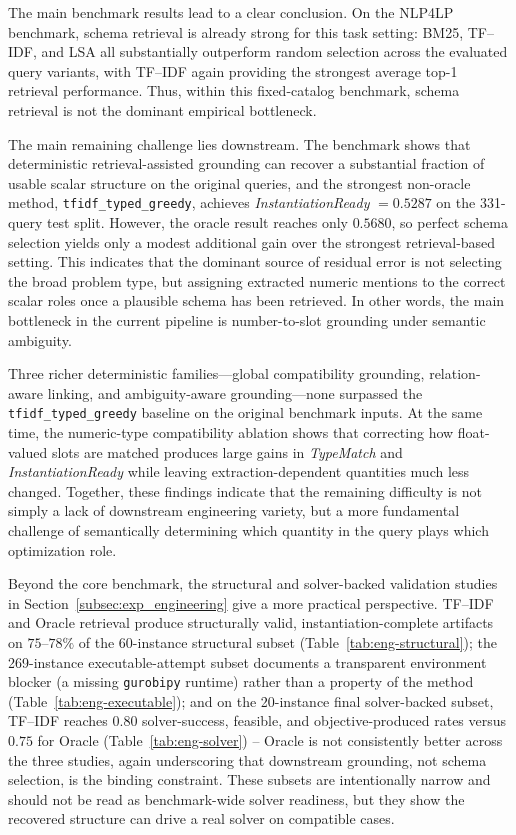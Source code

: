 \documentclass[pdflatex,sn-basic,Numbered]{sn-jnl}
\begin{document}
The main benchmark results lead to a clear conclusion. On the \textsc{NLP4LP} benchmark, schema retrieval is already strong for this task setting: BM25, TF--IDF, and LSA all substantially outperform random selection across the evaluated query variants, with TF--IDF again providing the strongest average top-1 retrieval performance. Thus, within this fixed-catalog benchmark, schema retrieval is not the dominant empirical bottleneck.

The main remaining challenge lies downstream. The benchmark shows that deterministic retrieval-assisted grounding can recover a substantial fraction of usable scalar structure on the original queries, and the strongest non-oracle method, \texttt{tfidf\_typed\_greedy}, achieves \textit{InstantiationReady} $=0.5287$ on the 331-query test split. However, the oracle result reaches only $0.5680$, so perfect schema selection yields only a modest additional gain over the strongest retrieval-based setting. This indicates that the dominant source of residual error is not selecting the broad problem type, but assigning extracted numeric mentions to the correct scalar roles once a plausible schema has been retrieved. In other words, the main bottleneck in the current pipeline is number-to-slot grounding under semantic ambiguity.

Three richer deterministic families---global compatibility grounding, relation-aware linking, and ambiguity-aware grounding---none surpassed the \texttt{tfidf\_typed\_greedy} baseline on the original benchmark inputs. At the same time, the numeric-type compatibility ablation shows that correcting how float-valued slots are matched produces large gains in \textit{TypeMatch} and \textit{InstantiationReady} while leaving extraction-dependent quantities much less changed. Together, these findings indicate that the remaining difficulty is not simply a lack of downstream engineering variety, but a more fundamental challenge of semantically determining which quantity in the query plays which optimization role.

Beyond the core benchmark, the structural and solver-backed validation studies in Section~\ref{subsec:exp_engineering} give a more practical perspective. TF--IDF and Oracle retrieval produce structurally valid, instantiation-complete artifacts on $75$--$78\%$ of the 60-instance structural subset (Table~\ref{tab:eng-structural}); the 269-instance executable-attempt subset documents a transparent environment blocker (a missing \texttt{gurobipy} runtime) rather than a property of the method (Table~\ref{tab:eng-executable}); and on the 20-instance final solver-backed subset, TF--IDF reaches $0.80$ solver-success, feasible, and objective-produced rates versus $0.75$ for Oracle (Table~\ref{tab:eng-solver}) -- Oracle is not consistently better across the three studies, again underscoring that downstream grounding, not schema selection, is the binding constraint. These subsets are intentionally narrow and should not be read as benchmark-wide solver readiness, but they show the recovered structure can drive a real solver on compatible cases.
\end{document}
